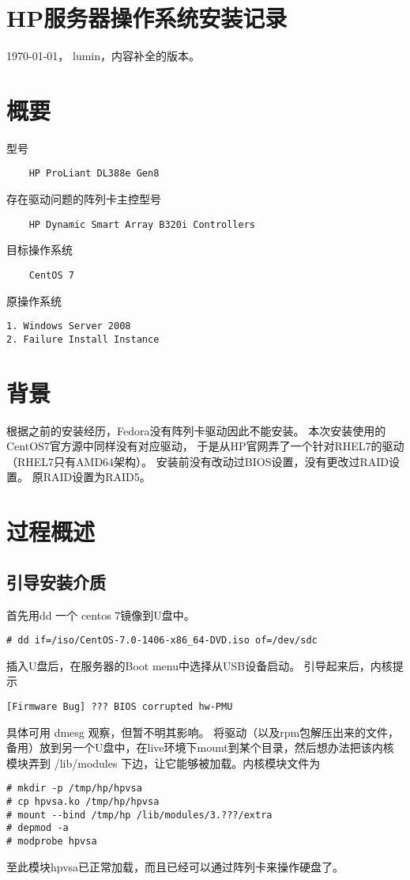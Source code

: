 \documentclass[a4paper,12pt]{article}
\begin{document}
\begin{CJK}{UTF8}{gbsn}

\section*{HP服务器操作系统安装记录}
	\today， lumin，内容补全的版本。

\section{概要}
	型号
	\begin{verbatim}
	HP ProLiant DL388e Gen8
	\end{verbatim}
	存在驱动问题的阵列卡主控型号
	\begin{verbatim}
	HP Dynamic Smart Array B320i Controllers
	\end{verbatim}
	目标操作系统
	\begin{verbatim}
	CentOS 7
	\end{verbatim}
	原操作系统
	\begin{verbatim}
1. Windows Server 2008
2. Failure Install Instance
	\end{verbatim}

\section{背景}
	根据之前的安装经历，Fedora没有阵列卡驱动因此不能安装。
	本次安装使用的CentOS7官方源中同样没有对应驱动，
	于是从HP官网弄了一个针对RHEL7的驱动（RHEL7只有AMD64架构）。
	\newline
	安装前没有改动过BIOS设置，没有更改过RAID设置。
	原RAID设置为RAID5。

\section{过程概述}
	\subsection{引导安装介质}
	首先用dd 一个 centos 7镜像到U盘中。
	\begin{verbatim}
# dd if=/iso/CentOS-7.0-1406-x86_64-DVD.iso of=/dev/sdc
	\end{verbatim}
	插入U盘后，在服务器的Boot menu中选择从USB设备启动。
	\newline
	引导起来后，内核提示
	\begin{verbatim}
[Firmware Bug] ??? BIOS corrupted hw-PMU
	\end{verbatim}
	具体可用 dmesg 观察，但暂不明其影响。
	将驱动（以及rpm包解压出来的文件，备用）放到另一个U盘中，在live环境下mount到某个目录，然后想办法把该内核模块弄到 /lib/modules 下边，让它能够被加载。内核模块文件为
	\begin{verbatim}
# mkdir -p /tmp/hp/hpvsa
# cp hpvsa.ko /tmp/hp/hpvsa
# mount --bind /tmp/hp /lib/modules/3.???/extra
# depmod -a
# modprobe hpvsa
	\end{verbatim}
	至此模块hpvsa已正常加载，而且已经可以通过阵列卡来操作硬盘了。


\end{CJK}
\end{document}

